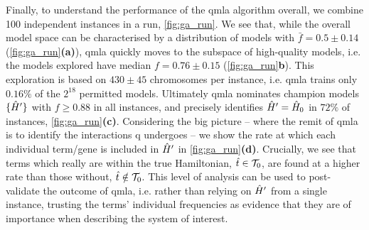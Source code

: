 Finally, to understand the performance of the \gls{qmla} algorithm overall, 
    we combine 100 independent \glspl{instance} in a \gls{run}, \cref{fig:ga_run}. 
We see that, while the overall \gls{model space} can be characterised by a distribution 
    of models with $\bar{f} = 0.5 \pm 0.14$ (\cref{fig:ga_run}\textbf{(a)}), 
    \gls{qmla} quickly moves to the subspace of high-quality models, 
    i.e. the models explored have median $f = 0.76 \pm 0.15$ (\cref{fig:ga_run}\textbf{b}).
This exploration is based on $430 \pm 45$ chromosomes per instance, 
    i.e. \gls{qmla} trains only $0.16\%$ of the $2^{18}$ permitted models. 
Ultimately \gls{qmla} nominates \glspl{champion model} $\{ \hat{H}^{\prime} \}$ with $f \geq 0.88$ in all instances, 
    and precisely identifies $\hat{H}^{\prime}=\hat{H}_0$ in $72\%$ of instances, \cref{fig:ga_run}\textbf{(c)}. 
Considering the big picture 
    -- where the remit of \gls{qmla} is to identify the interactions \gls{q} undergoes -- 
    we show the rate at which each individual term/gene is included in $\hat{H}^{\prime}$ in 
    \cref{fig:ga_run}\textbf{(d)}. 
Crucially, we see that terms which really are within the true Hamiltonian, $\hat{t} \in \mathcal{T}_0$, 
    are found at a higher rate than those without, $\hat{t} \notin \mathcal{T}_0$. 
This level of analysis can be used to post-validate the outcome of \gls{qmla}, 
    i.e. rather than relying on $\hat{H}^{\prime}$ from a single instance, 
    trusting the terms' individual frequencies as evidence that they are of importance when describing 
    the system of interest. 
\par 

